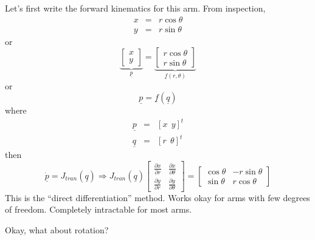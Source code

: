 \documentclass[]{article}
\begin{document}
Let's first write the forward kinematics for this arm. From inspection,
\begin{eqnarray}
x & = & r \cos \theta \nonumber \\
y & = & r \sin \theta \nonumber
\end{eqnarray}
or
\begin{displaymath}
	\underbrace{\left[ \begin{array}{c} x \\ y \end{array} \right]}_{\underline{p}} = \underbrace{\left[ \begin{array}{c} r \cos \theta \\ r \sin \theta \end{array} \right]}_{\underline{f}(r, \theta)}
\end{displaymath}
or
\begin{displaymath}
	\underline{p} = \underline{f}(\underline{q})
\end{displaymath}
where
\begin{eqnarray}
\underline{p} & = & [x\ \ y]^{t} \nonumber \\
\underline{q} & = & [r\ \ \theta]^{t} \nonumber
\end{eqnarray}
then
\begin{equation}
	\dot{\underline{p}} = J_{tran}(\underline{q}) \Rightarrow J_{tran}(\underline{q}) \left[ \begin{array}{cc} \frac{\partial x}{\partial r} & \frac{\partial x}{\partial \theta} \\ \frac{\partial y}{\partial r} & \frac{\partial y}{\partial \theta} \end{array} \right] = \left[ \begin{array}{cc} \cos \theta & -r \sin \theta \\ \sin \theta & r \cos \theta \end{array} \right]
\end{equation}
This is the ``direct differentiation'' method. Works okay for arms with few degrees of freedom. Completely intractable for most arms.

Okay, what about rotation?
\end{document}
